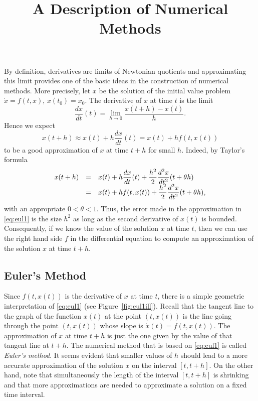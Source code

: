 \documentclass{ximera}
\title{A Description of Numerical Methods}
\begin{document}
\begin{abstract}
\end{abstract}
\maketitle


\label{sec:DNM}

By definition, derivatives are limits of Newtonian quotients and 
approximating this limit provides one of the basic ideas in the 
construction of numerical methods.  More precisely, let $x$ be the 
solution of the initial value problem $\dot x = f(t,x)$, $x(t_0)=x_0$.  
The derivative of $x$ at time $t$ is the limit
\[
\frac{dx}{dt}(t) = \lim_{h\to 0} \frac{x(t+h) - x(t)}{h}.
\]
Hence we expect
\begin{equation}  \label{eq:eul1}
x(t+h) \approx x(t) + h \frac{dx}{dt}(t) = x(t) + h f(t,x(t))
\end{equation}
to be a good approximation of $x$ at time $t+h$ for small $h$.
Indeed, by Taylor's formula
\arraystart
\begin{equation}\label{eq:tfeul}
\begin{array}{rcl}
\displaystyle x(t+h)&=&
\displaystyle x(t)+h\frac{dx}{dt}(t)+\frac{h^2}{2}\frac{d^2x}{dt^2}(t+\theta h)\\
&=& \displaystyle x(t)+hf(t,x(t))+\frac{h^2}{2}\frac{d^2x}{dt^2}(t+\theta h),
\end{array}
\end{equation}
\arrayfinish
with an appropriate $0<\theta<1$.  Thus, the error made in the
approximation in \eqref{eq:eul1} is the size $h^2$
as long as the second derivative of $x(t)$ is bounded.
Consequently, if we know the value of the solution $x$ at time $t$, 
then we can use the right hand side $f$ in the differential equation 
to compute an approximation of the solution $x$ at time $t+h$.

\subsection*{Euler's Method} 

Since $f(t,x(t))$ is the derivative of $x$ at time $t$,
there is a simple geometric interpretation of \eqref{eq:eul1}
(see Figure~\ref{fig:eul1ill}).  Recall that the tangent line to the 
graph of the function $x(t)$ at the point $(t,x(t))$ is the line 
going through the point $(t,x(t))$ whose slope is $\dot{x}(t)=f(t,x(t))$.  
The approximation of $x$ at time $t+h$ is just the one given by the value 
of that tangent line at $t+h$.  The numerical method that is based on 
\eqref{eq:eul1} is called {\em Euler's method}.
It seems evident that smaller values of $h$ should lead to a more 
accurate approximation of the solution $x$ on the interval
$[t,t+h]$.  On the other hand, note that simultaneously the 
length of the interval $[t,t+h]$ is shrinking and that more
approximations are needed to approximate a solution on a
fixed time interval.
\begin{figure*}[htb]
   \centerline{%
   }
   \caption{Illustration of one step in Euler's method
   for $h=0.2$.}
   \label{fig:eul1ill}
\end{figure*}
\end{document}
